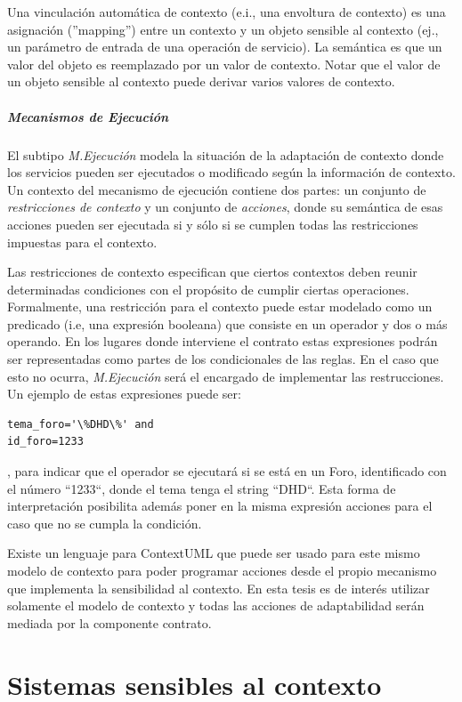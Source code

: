 Una vinculación automática de contexto (e.i., una envoltura de contexto) es
una asignación (''mapping'') entre un contexto y un objeto sensible al
contexto (ej., un parámetro de entrada de una operación de servicio). La
semántica es que un valor del objeto es reemplazado por un valor de contexto.
Notar que el valor de un objeto sensible al contexto puede derivar varios
valores de contexto. 
 

\subparagraph{Mecanismos de Ejecución}

El subtipo \textit{M.Ejecución} modela la situación de la adaptación de
contexto
donde los servicios pueden ser ejecutados o modificado según la información
de contexto. Un contexto del mecanismo de ejecución contiene dos partes: un
conjunto de \textit{restricciones de contexto} y un conjunto de
\textit{acciones}, donde su semántica de esas acciones pueden ser ejecutada si
y sólo si se cumplen todas las restricciones impuestas para el contexto. 

Las restricciones de contexto especifican que ciertos contextos deben reunir
determinadas condiciones con el propósito de cumplir ciertas operaciones.
Formalmente, una restricción para el contexto puede estar modelado como un
predicado \cite{ContextUML} (i.e, una expresión booleana) que consiste en un
operador y dos o más operando. En los lugares donde interviene el contrato
estas expresiones podrán ser representadas como partes de los condicionales
de las reglas. En el caso que esto no ocurra, \textit{M.Ejecución} será el
encargado de implementar las restrucciones. Un ejemplo de estas expresiones
puede ser: \begin{verbatim}tema_foro='\%DHD\%' and
id_foro=1233\end{verbatim}, para indicar que el operador se ejecutará si se
está en un Foro, identificado con el número ``1233``, donde el tema tenga el
string ``DHD``. Esta forma de interpretación posibilita además poner en
la misma expresión acciones para el caso que no se cumpla la condición.

Existe un lenguaje para ContextUML \cite{ContextUML} que puede ser usado para
este mismo modelo de contexto para poder programar acciones desde el propio
mecanismo que implementa la sensibilidad al contexto. En esta tesis es de
interés utilizar solamente el modelo de contexto y todas las acciones de
adaptabilidad serán mediada por la componente contrato. 

\section{Sistemas sensibles al contexto}\label{sec:sca}



